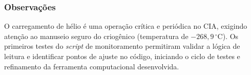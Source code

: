\subsubsection*{Observações}

O carregamento de hélio é uma operação crítica e periódica no CIA,
exigindo atenção ao manuseio seguro do criogênico (temperatura de
$-268{,}9\,^{\circ}$C). Os primeiros testes do \textit{script} de
monitoramento permitiram validar a lógica de leitura e identificar
pontos de ajuste no código, iniciando o ciclo de testes e refinamento
da ferramenta computacional desenvolvida.
